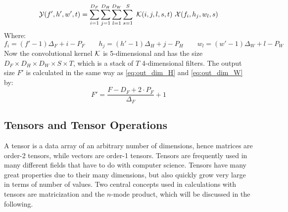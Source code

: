 \begin{equation}
    \tensor{Y}(f', h', w', t) = \sum_{i=1}^{D_F} \sum_{j=1}^{D_H} \sum_{l=1}^{D_W} \sum_{s=1}^{S} \ \tensor{K}(i, j, l, s, t) \ \tensor{X}(f_i, h_j, w_l, s)
\end{equation}
Where:
\begin{equation}
    f_i = \left(f' - 1\right) \Delta_F + i - P_F \qquad h_j =  \left(h' - 1\right) \Delta_H + j - P_H \qquad w_l =  \left(w' - 1\right) \Delta_W + l - P_W
\end{equation}
Now the convolutional kernel $\mathcal{K}$ is 5-dimensional and has the size $D_F \times D_H \times D_W \times S \times T$, which is a stack of $T$ 4-dimensional filters. The output size $F'$ is calculated in the same way as \eqref{eq:out_dim_H} and \eqref{eq:out_dim_W} by:
\begin{equation}
    F' = \frac{F - D_F + 2\cdot P_F}{\Delta_F} + 1
    \label{eq:out_dim_F}
\end{equation}


\subsection{Tensors and Tensor Operations} \label{tex:tensor_operations}
A tensor is a data array of an arbitrary number of dimensions, hence matrices are order-2 tensors, while vectors are order-1 tensors. Tensors are frequently used in many different fields that have to do with computer science\cite{Mørup2011}. Tensors have many great properties due to their many dimensions, but also quickly grow very large in terms of number of values. Two central concepts used in calculations with tensors are matricization and the $n$-mode product, which will be discussed in the following.
 
